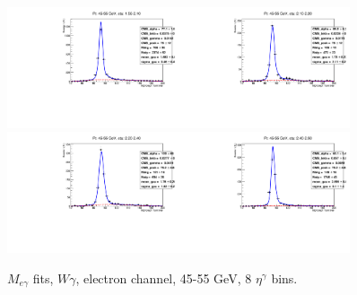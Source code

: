 \begin{figure}[htb]
\begin{center}
   \includegraphics[width=0.45\textwidth]{../figs/figs_v11/ELECTRON_WGamma/EtoGammaFits/sa_hZmass_h_Data_EtoGamma_Enr_ENDCAP_pt45to55_ieta0.pdf}\includegraphics[width=0.45\textwidth]{../figs/figs_v11/ELECTRON_WGamma/EtoGammaFits/sa_hZmass_h_Data_EtoGamma_Enr_ENDCAP_pt45to55_ieta1.pdf}\\
   \includegraphics[width=0.45\textwidth]{../figs/figs_v11/ELECTRON_WGamma/EtoGammaFits/sa_hZmass_h_Data_EtoGamma_Enr_ENDCAP_pt45to55_ieta2.pdf}\includegraphics[width=0.45\textwidth]{../figs/figs_v11/ELECTRON_WGamma/EtoGammaFits/sa_hZmass_h_Data_EtoGamma_Enr_ENDCAP_pt45to55_ieta3.pdf}\\
  \label{fig:etogFits_45to55}
  \caption{$M_{e\gamma}$ fits, $W\gamma$, electron channel, 45-55 GeV, 8 $\eta^{\gamma}$ bins.}
  \end{center}
\end{figure}

